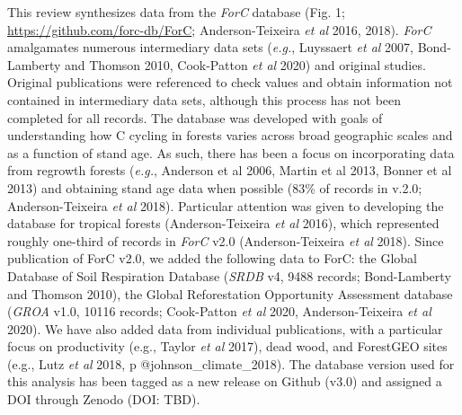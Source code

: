 \documentclass[
]{article}
\begin{document}
This review synthesizes data from the \emph{ForC} database (Fig. 1;
\url{https://github.com/forc-db/ForC}; Anderson-Teixeira \emph{et al}
2016, 2018). \emph{ForC} amalgamates numerous intermediary data sets
(\emph{e.g.}, Luyssaert \emph{et al} 2007, Bond-Lamberty and Thomson
2010, Cook-Patton \emph{et al} 2020) and original studies. Original
publications were referenced to check values and obtain information not
contained in intermediary data sets, although this process has not been
completed for all records. The database was developed with goals of
understanding how C cycling in forests varies across broad geographic
scales and as a function of stand age. As such, there has been a focus
on incorporating data from regrowth forests (\emph{e.g.}, Anderson et al
2006, Martin et al 2013, Bonner et al 2013) and obtaining stand age data
when possible (83\% of records in v.2.0; Anderson-Teixeira \emph{et al}
2018). Particular attention was given to developing the database for
tropical forests (Anderson-Teixeira \emph{et al} 2016), which
represented roughly one-third of records in \emph{ForC} v2.0
(Anderson-Teixeira \emph{et al} 2018). Since publication of ForC v2.0,
we added the following data to ForC: the Global Database of Soil
Respiration Database (\emph{SRDB} v4, 9488 records; Bond-Lamberty and
Thomson 2010), the Global Reforestation Opportunity Assessment database
(\emph{GROA} v1.0, 10116 records; Cook-Patton \emph{et al} 2020,
Anderson-Teixeira \emph{et al} 2020). We have also added data from
individual publications, with a particular focus on productivity (e.g.,
Taylor \emph{et al} 2017), dead wood, and ForestGEO sites (e.g., Lutz
\emph{et al} 2018, p @johnson\_climate\_2018). The database version used
for this analysis has been tagged as a new release on Github (v3.0) and
assigned a DOI through Zenodo (DOI: TBD).
\end{document}

